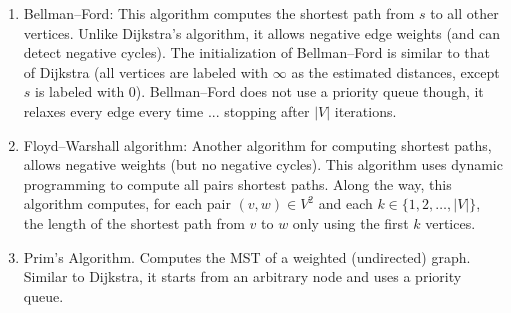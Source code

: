 \documentclass{article}
\begin{document}
\begin{enumerate}
    \item Bellman--Ford: This algorithm computes the shortest path from $s$ to
        all other vertices. Unlike Dijkstra's algorithm, it allows negative edge
        weights (and can detect negative cycles).
        The initialization of Bellman--Ford
        is similar to that of Dijkstra (all
        vertices are labeled with $\infty$ as the estimated distances, except
        $s$ is labeled with $0$). Bellman--Ford does not use a priority queue
        though, it relaxes every edge every time ... stopping after $|V|$
        iterations.
    \item Floyd--Warshall algorithm: Another algorithm for computing shortest
        paths, allows negative weights (but no negative cycles).  This algorithm
        uses dynamic programming to compute all pairs shortest paths.  Along the
        way, this algorithm computes, for each pair $(v,w)\in V^2$ and each $k
        \in \{1, 2, \ldots, |V|\}$, the length of the shortest path from $v$ to
        $w$ only using the first $k$ vertices.
    \item Prim's Algorithm. Computes the MST of a weighted (undirected) graph.
        Similar to Dijkstra, it starts from an arbitrary node and uses a
        priority queue.
\end{enumerate}
\end{document}
